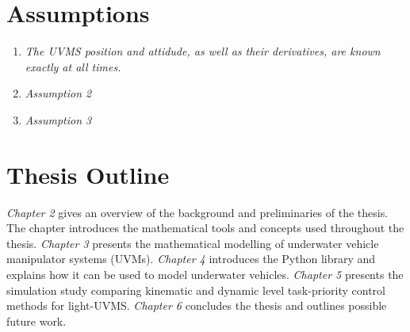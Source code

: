 
\section{Assumptions}
\begin{enumerate}
    \item \emph{The UVMS position and attidude, as well as their derivatives, are
        known exactly at all times.}
    \item \emph{Assumption 2}
    \item \emph{Assumption 3}
\end{enumerate}

\iffalse
\section{Contributions}

The main contributions as presented in this thesis are as follows:
\begin{itemize}
    \item \emph{A Python library for generating dynamic models of UVMSs, allowing
        for rapid prototyping of models.}
    \item \emph{A simulator in C++, together with a set of task-priority controllers
        ,using the generated models to simulate the behavior of UVMSs.}
    \item \emph{A simulation study comparing kinematic and dynamic level
        task-priority control methods for light-UVMS.}
\end{itemize}
\fi

\section{Thesis Outline}

\emph{Chapter 2} gives an overview of the background and preliminaries of the
thesis. The chapter introduces the mathematical tools and concepts used throughout
the thesis. \emph{Chapter 3} presents the mathematical modelling of underwater
vehicle manipulator systems (UVMs). \emph{Chapter 4} introduces the Python library
\pymuvs and explains how it can be used to model underwater vehicles. \emph{Chapter 5}
presents the simulation study comparing kinematic and dynamic level task-priority
control methods for light-UVMS. \emph{Chapter 6} concludes the thesis and outlines
possible future work.
